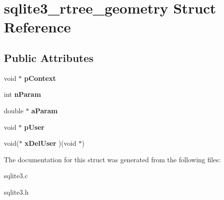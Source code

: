 \hypertarget{structsqlite3__rtree__geometry}{\section{sqlite3\-\_\-rtree\-\_\-geometry Struct Reference}
\label{structsqlite3__rtree__geometry}
}
\subsection*{Public Attributes}
\begin{DoxyCompactItemize}
\item 
\hypertarget{structsqlite3__rtree__geometry_a33f98691626846c1317419654d5c5f51}{void $\ast$ {\bfseries p\-Context}}\label{structsqlite3__rtree__geometry_a33f98691626846c1317419654d5c5f51}

\item 
\hypertarget{structsqlite3__rtree__geometry_ada7b9eba82660e3321dd4c93526697c9}{int {\bfseries n\-Param}}\label{structsqlite3__rtree__geometry_ada7b9eba82660e3321dd4c93526697c9}

\item 
\hypertarget{structsqlite3__rtree__geometry_aa23f6565e6fee2416444333a75716057}{double $\ast$ {\bfseries a\-Param}}\label{structsqlite3__rtree__geometry_aa23f6565e6fee2416444333a75716057}

\item 
\hypertarget{structsqlite3__rtree__geometry_a6fdedfd741cf5055f9562298cd32dc74}{void $\ast$ {\bfseries p\-User}}\label{structsqlite3__rtree__geometry_a6fdedfd741cf5055f9562298cd32dc74}

\item 
\hypertarget{structsqlite3__rtree__geometry_afa1ed10f488b306df354efe56efdf287}{void($\ast$ {\bfseries x\-Del\-User} )(void $\ast$)}\label{structsqlite3__rtree__geometry_afa1ed10f488b306df354efe56efdf287}

\end{DoxyCompactItemize}


The documentation for this struct was generated from the following files\-:\begin{DoxyCompactItemize}
\item 
sqlite3.\-c\item 
sqlite3.\-h\end{DoxyCompactItemize}
